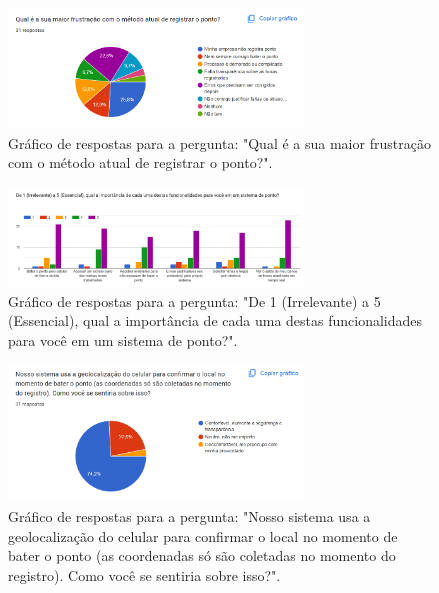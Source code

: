 \begin{apendicesenv}
\begin{figure}[h!]
  \centering
  \includegraphics[width=0.7\textwidth]{imagens/maior-frustracao.png}
  \caption{Gráfico de respostas para a pergunta: "Qual é a sua maior frustração com o método atual de registrar o ponto?".}
  \label{fig:resp-func-maior-frustacao}
\end{figure}

\begin{figure}[h!]
  \centering
  \includegraphics[width=0.7\textwidth]{imagens/importancia-funcionalidades.png}
  \caption{Gráfico de respostas para a pergunta: "De 1 (Irrelevante) a 5 (Essencial), qual a importância de cada uma destas funcionalidades para você em um sistema de ponto?".}
  \label{fig:resp-func-importancia-funcionalidades}
\end{figure}

\begin{figure}[h!]
  \centering
  \includegraphics[width=0.7\textwidth]{imagens/geolocalizacao.png}
  \caption{Gráfico de respostas para a pergunta: "Nosso sistema usa a geolocalização do celular para confirmar o local no momento de bater o ponto (as coordenadas só são coletadas no momento do registro). Como você se sentiria sobre isso?".}
  \label{fig:resp-func-geolocalizacao}
\end{figure}


\end{apendicesenv}
